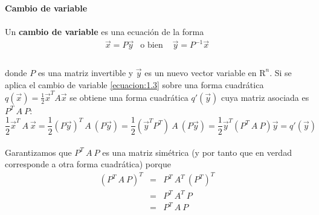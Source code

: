 \newpage
\textbf{Cambio de variable}
\paragraph*{}
Un \textbf{cambio de variable} es una ecuación de la forma
\begin{equation}
    \begin{matrix} 
    \overrightarrow{x} = P\overrightarrow{y} & \mbox{o bien } & \overrightarrow{y} = P^{-1}\overrightarrow{x}\\
    \end{matrix}
    \label{ecuacion:1.3}
\end{equation}
\paragraph*{}
donde $P$ es una matriz invertible y $\overrightarrow{y}$ es un nuevo vector variable en $\mathrm{R}^{n}$. Si se aplica el cambio de variable \ref{ecuacion:1.3} sobre una forma cuadrática $q(\overrightarrow{x}) = \frac{1}{2}\overrightarrow{x}^{T}A\overrightarrow{x}$ se obtiene una forma cuadrática $q'(\overrightarrow{y})$ cuya matriz asociada es $P^{T} ~ A ~ P$:
\begin{equation*}
    \frac{1}{2}\overrightarrow{x}^{T}~A~\overrightarrow{x} = \frac{1}{2}\left(P\overrightarrow{y}\right)^{T}~A~\left(P\overrightarrow{y}\right) = \frac{1}{2}\left(\overrightarrow{y}^{T} P^{T}\right)~A~\left(P\overrightarrow{y}\right) = \frac{1}{2}\overrightarrow{y}^{T}\left(P^{T}~A~P\right)\overrightarrow{y} = 
    q'(\overrightarrow{y})
\end{equation*}
\paragraph*{}
Garantizamos que $P^{T}~A~P$ es una matriz simétrica (y por tanto que en verdad corresponde a otra forma cuadrática) porque
\begin{eqnarray*}
\left(P^{T}~A~P\right)^{T}&=&P^{T}~A^{T}~\left(P^{T}\right)^{T}\\
&=&P^{T}~A^{T}~P\\
&=&P^{T}~A~P
\end{eqnarray*}
